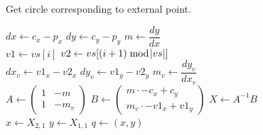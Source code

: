 \documentclass[a4paper,12pt]{article}
\numberwithin{figure}{section}
\begin{document}
        \begin{algorithm}[H]
            \caption{Get circle corresponding to external point.}
            \begin{algorithmic}
                    \State $dx \gets c_x - p_x$
                    \State $dy \gets c_y - p_y$
                    \State $m \gets \dfrac{dy}{dx}$
                    \\
                        \State $v1 \gets vs[i]$
                        \State $v2 \gets vs[(i+1) \bmod \abs{vs}]$
                        \\
                        
                        \State $dx_v \gets v1_x - v2_x$
                        \State $dy_v \gets v1_y - v2_y$
                        \State $m_v \gets \dfrac{dy_v}{dx_v}$
                        \\
                        
                        \State $A \gets
                            \begin{pmatrix}
                                1 & -m\\
                                1 & -m_v
                            \end{pmatrix}$
                        \State $B \gets 
                            \begin{pmatrix}
                                m \cdot -c_x + c_y\\
                                m_v \cdot -v1_x + v1_y
                            \end{pmatrix}$
                        \State $X \gets A^{-1}B$
                        \\
                        
                        \State $x \gets X_{2,1}$
                        \State $y \gets X_{1,1}$
                        \State $q \gets (x,y)$
                        \\
                        

\end{algorithmic}
\end{algorithm}
\end{document}
